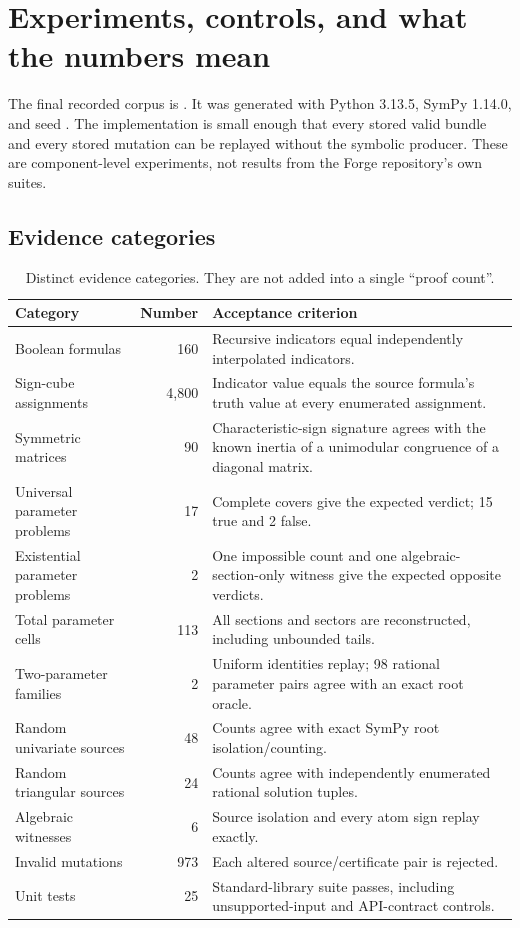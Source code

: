 \section{Experiments, controls, and what the numbers mean}\label{sec:experiments}

The final recorded corpus is . It was generated with Python 3.13.5, SymPy 1.14.0, and seed . The implementation is small enough that every stored valid bundle and every stored mutation can be replayed without the symbolic producer. These are component-level experiments, not results from the Forge repository's own suites.

\subsection{Evidence categories}

\begin{table}[ht]
\centering
\begin{tabularx}{\textwidth}{@{}l r X@{}}
\toprule
Category & Number & Acceptance criterion\\
\midrule
Boolean formulas & 160 & Recursive indicators equal independently interpolated indicators.\\
Sign-cube assignments & 4,800 & Indicator value equals the source formula's truth value at every enumerated assignment.\\
Symmetric matrices & 90 & Characteristic-sign signature agrees with the known inertia of a unimodular congruence of a diagonal matrix.\\
Universal parameter problems & 17 & Complete covers give the expected verdict; 15 true and 2 false.\\
Existential parameter problems & 2 & One impossible count and one algebraic-section-only witness give the expected opposite verdicts.\\
Total parameter cells & 113 & All sections and sectors are reconstructed, including unbounded tails.\\
Two-parameter families & 2 & Uniform identities replay; 98 rational parameter pairs agree with an exact root oracle.\\
Random univariate sources & 48 & Counts agree with exact SymPy root isolation/counting.\\
Random triangular sources & 24 & Counts agree with independently enumerated rational solution tuples.\\
Algebraic witnesses & 6 & Source isolation and every atom sign replay exactly.\\
Invalid mutations & 973 & Each altered source/certificate pair is rejected.\\
Unit tests & 25 & Standard-library suite passes, including unsupported-input and API-contract controls.\\
\bottomrule
\end{tabularx}
\caption{Distinct evidence categories. They are not added into a single ``proof count''.}
\end{table}

